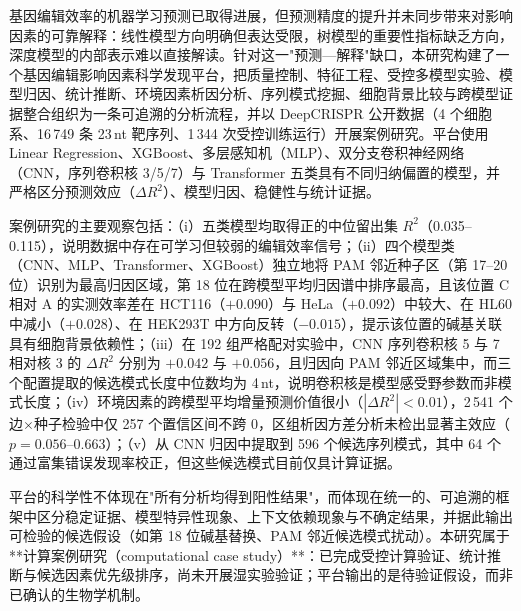 基因编辑效率的机器学习预测已取得进展，但预测精度的提升并未同步带来对影响因素的可靠解释：线性模型方向明确但表达受限，树模型的重要性指标缺乏方向，深度模型的内部表示难以直接解读。针对这一"预测—解释"缺口，本研究构建了一个基因编辑影响因素科学发现平台，把质量控制、特征工程、受控多模型实验、模型归因、统计推断、环境因素析因分析、序列模式挖掘、细胞背景比较与跨模型证据整合组织为一条可追溯的分析流程，并以 DeepCRISPR 公开数据（4 个细胞系、16\,749 条 23\,nt 靶序列、1\,344 次受控训练运行）开展案例研究。平台使用 Linear Regression、XGBoost、多层感知机（MLP）、双分支卷积神经网络（CNN，序列卷积核 3/5/7）与 Transformer 五类具有不同归纳偏置的模型，并严格区分预测效应（$\Delta R^{2}$）、模型归因、稳健性与统计证据。

案例研究的主要观察包括：（i）五类模型均取得正的中位留出集 $R^{2}$（0.035--0.115），说明数据中存在可学习但较弱的编辑效率信号；（ii）四个模型类（CNN、MLP、Transformer、XGBoost）独立地将 PAM 邻近种子区（第 17--20 位）识别为最高归因区域，第 18 位在跨模型平均归因谱中排序最高，且该位置 C 相对 A 的实测效率差在 HCT116（$+0.090$）与 HeLa（$+0.092$）中较大、在 HL60 中减小（$+0.028$）、在 HEK293T 中方向反转（$-0.015$），提示该位置的碱基关联具有细胞背景依赖性；（iii）在 192 组严格配对实验中，CNN 序列卷积核 5 与 7 相对核 3 的 $\Delta R^{2}$ 分别为 $+0.042$ 与 $+0.056$，且归因向 PAM 邻近区域集中，而三个配置提取的候选模式长度中位数均为 4\,nt，说明卷积核是模型感受野参数而非模式长度；（iv）环境因素的跨模型平均增量预测价值很小（$|\Delta R^{2}|<0.01$），2\,541 个边$\times$种子检验中仅 257 个置信区间不跨 0，区组析因方差分析未检出显著主效应（$p=0.056$--$0.663$）；（v）从 CNN 归因中提取到 596 个候选序列模式，其中 64 个通过富集错误发现率校正，但这些候选模式目前仅具计算证据。

平台的科学性不体现在"所有分析均得到阳性结果"，而体现在统一的、可追溯的框架中区分稳定证据、模型特异性现象、上下文依赖现象与不确定结果，并据此输出可检验的候选假设（如第 18 位碱基替换、PAM 邻近候选模式扰动）。本研究属于**计算案例研究（computational case study）**：已完成受控计算验证、统计推断与候选因素优先级排序，尚未开展湿实验验证；平台输出的是待验证假设，而非已确认的生物学机制。

